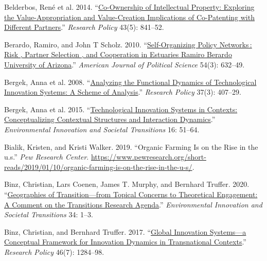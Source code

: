 \documentclass[twoside,12pt,final]{ucthesis-CA2012}
\newlength{\cslhangindent}
\newenvironment{CSLReferences}[2] %
 {%
  \setlength{\parindent}{0pt}
  \ifodd #1 \everypar{\setlength{\hangindent}{\cslhangindent}}\ignorespaces\fi
  \ifnum #2 > 0
  \setlength{\parskip}{#2\baselineskip}
  \fi
 }%
 {}
\begin{document}
\begin{ucmainmatter}
\begin{CSLReferences}{1}{0}
\leavevmode{}%
Belderbos, René et al. 2014. {``\href{https://doi.org/10.1016/j.respol.2013.08.013}{Co-Ownership of Intellectual Property: Exploring the Value-Appropriation and Value-Creation Implications of Co-Patenting with Different Partners}.''} \emph{Research Policy} 43(5): 841--52.

\leavevmode{}%
Berardo, Ramiro, and John T Scholz. 2010. {``\href{https://doi.org/10.1111/j.1540-5907.2010.00451.x}{Self-Organizing Policy Networks\,: Risk , Partner Selection , and Cooperation in Estuaries Ramiro Berardo University of Arizona}.''} \emph{American Journal of Political Science} 54(3): 632--49.

\leavevmode{}%
Bergek, Anna et al. 2008. {``\href{https://doi.org/10.1016/j.respol.2007.12.003}{Analyzing the Functional Dynamics of Technological Innovation Systems: A Scheme of Analysis}.''} \emph{Research Policy} 37(3): 407--29.

\leavevmode{}%
Bergek, Anna et al. 2015. {``\href{https://doi.org/10.1016/j.eist.2015.07.003}{Technological Innovation Systems in Contexts: Conceptualizing Contextual Structures and Interaction Dynamics}.''} \emph{Environmental Innovation and Societal Transitions} 16: 51--64.

\leavevmode{}%
Bialik, Kristen, and Kristi Walker. 2019. {``Organic Farming Is on the Rise in the u.s.''} \emph{Pew Research Center}. \url{https://www.pewresearch.org/short-reads/2019/01/10/organic-farming-is-on-the-rise-in-the-u-s/}.

\leavevmode{}%
Binz, Christian, Lars Coenen, James T. Murphy, and Bernhard Truffer. 2020. {``\href{https://doi.org/10.1016/j.eist.2019.11.002}{Geographies of Transition---from Topical Concerns to Theoretical Engagement: A Comment on the Transitions Research Agenda}.''} \emph{Environmental Innovation and Societal Transitions} 34: 1--3.

\leavevmode{}%
Binz, Christian, and Bernhard Truffer. 2017. {``\href{https://doi.org/10.1016/j.respol.2017.05.012}{Global Innovation Systems---a Conceptual Framework for Innovation Dynamics in Transnational Contexts}.''} \emph{Research Policy} 46(7): 1284--98.


\end{CSLReferences}
\end{ucmainmatter}
\end{document}
